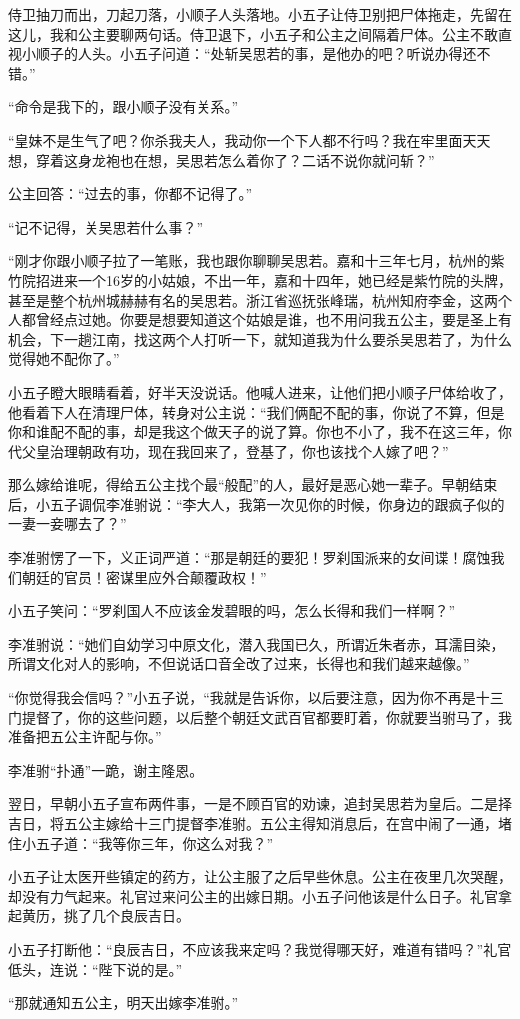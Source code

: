 侍卫抽刀而出，刀起刀落，小顺子人头落地。小五子让侍卫别把尸体拖走，先留在这儿，我和公主要聊两句话。侍卫退下，小五子和公主之间隔着尸体。公主不敢直视小顺子的人头。小五子问道：“处斩吴思若的事，是他办的吧？听说办得还不错。”

“命令是我下的，跟小顺子没有关系。”

“皇妹不是生气了吧？你杀我夫人，我动你一个下人都不行吗？我在牢里面天天想，穿着这身龙袍也在想，吴思若怎么着你了？二话不说你就问斩？”

公主回答：“过去的事，你都不记得了。”

“记不记得，关吴思若什么事？”

“刚才你跟小顺子拉了一笔账，我也跟你聊聊吴思若。嘉和十三年七月，杭州的紫竹院招进来一个16岁的小姑娘，不出一年，嘉和十四年，她已经是紫竹院的头牌，
甚至是整个杭州城赫赫有名的吴思若。浙江省巡抚张峰瑞，杭州知府李金，这两个人都曾经点过她。你要是想要知道这个姑娘是谁，也不用问我五公主，要是圣上有机会，下一趟江南，找这两个人打听一下，就知道我为什么要杀吴思若了，为什么觉得她不配你了。”

小五子瞪大眼睛看着，好半天没说话。他喊人进来，让他们把小顺子尸体给收了，他看着下人在清理尸体，转身对公主说：“我们俩配不配的事，你说了不算，但是你和谁配不配的事，却是我这个做天子的说了算。你也不小了，我不在这三年，你代父皇治理朝政有功，现在我回来了，登基了，你也该找个人嫁了吧？”

那么嫁给谁呢，得给五公主找个最“般配”的人，最好是恶心她一辈子。早朝结束后，小五子调侃李准驸说：“李大人，我第一次见你的时候，你身边的跟疯子似的一妻一妾哪去了？”

李准驸愣了一下，义正词严道：“那是朝廷的要犯！罗刹国派来的女间谍！腐蚀我们朝廷的官员！密谋里应外合颠覆政权！”

小五子笑问：“罗刹国人不应该金发碧眼的吗，怎么长得和我们一样啊？”

李准驸说：“她们自幼学习中原文化，潜入我国已久，所谓近朱者赤，耳濡目染，所谓文化对人的影响，不但说话口音全改了过来，长得也和我们越来越像。”

“你觉得我会信吗？”小五子说，“我就是告诉你，以后要注意，因为你不再是十三门提督了，你的这些问题，以后整个朝廷文武百官都要盯着，你就要当驸马了，我准备把五公主许配与你。”

李准驸“扑通”一跪，谢主隆恩。

翌日，早朝小五子宣布两件事，一是不顾百官的劝谏，追封吴思若为皇后。二是择吉日，将五公主嫁给十三门提督李准驸。五公主得知消息后，在宫中闹了一通，堵住小五子道：“我等你三年，你这么对我？”

小五子让太医开些镇定的药方，让公主服了之后早些休息。公主在夜里几次哭醒，却没有力气起来。礼官过来问公主的出嫁日期。小五子问他该是什么日子。礼官拿起黄历，挑了几个良辰吉日。

小五子打断他：“良辰吉日，不应该我来定吗？我觉得哪天好，难道有错吗？”礼官低头，连说：“陛下说的是。”

“那就通知五公主，明天出嫁李准驸。”

\newpage